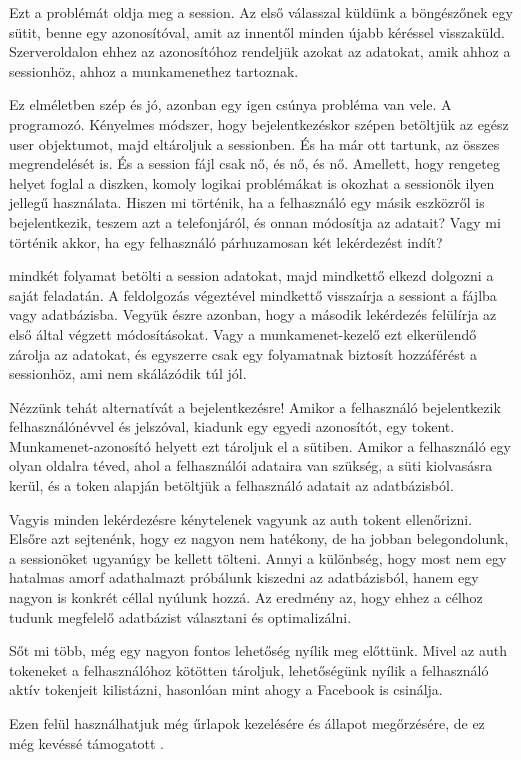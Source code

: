 Ezt a problémát oldja meg a session. Az első válasszal küldünk a böngészőnek egy sütit, benne egy azonosítóval, amit az innentől minden újabb kéréssel visszaküld. Szerveroldalon ehhez az azonosítóhoz rendeljük azokat az adatokat, amik ahhoz a sessionhöz, ahhoz a munkamenethez tartoznak.

Ez elméletben szép és jó, azonban egy igen csúnya probléma van vele. A programozó.
Kényelmes módszer, hogy bejelentkezéskor szépen betöltjük az egész user objektumot, majd eltároljuk a sessionben. És ha már ott tartunk, az összes megrendelését is. És a session fájl csak nő, és nő, és nő.
Amellett, hogy rengeteg helyet foglal a diszken, komoly logikai problémákat is okozhat a sessionök ilyen jellegű használata. Hiszen mi történik, ha a felhasználó egy másik eszközről is bejelentkezik, teszem azt a telefonjáról, és onnan módosítja az adatait? Vagy mi történik akkor, ha egy felhasználó párhuzamosan két lekérdezést indít?

mindkét folyamat betölti a session adatokat, majd mindkettő elkezd dolgozni a saját feladatán. A feldolgozás végeztével mindkettő visszaírja a sessiont a fájlba vagy adatbázisba. Vegyük észre azonban, hogy a második lekérdezés felülírja az első által végzett módosításokat. Vagy a munkamenet-kezelő ezt elkerülendő zárolja az adatokat, és egyszerre csak egy folyamatnak biztosít hozzáférést a sessionhöz, ami nem skálázódik túl jól.

Nézzünk tehát alternatívát a bejelentkezésre!
Amikor a felhasználó bejelentkezik felhasználónévvel és jelszóval, kiadunk egy egyedi azonosítót, egy tokent. Munkamenet-azonosító helyett ezt tároljuk el a sütiben. Amikor a felhasználó egy olyan oldalra téved, ahol a felhasználói adataira van szükség, a süti kiolvasásra kerül, és a token alapján betöltjük a felhasználó adatait az adatbázisból.

Vagyis minden lekérdezésre kénytelenek vagyunk az auth tokent ellenőrizni. Elsőre azt sejtenénk, hogy ez nagyon nem hatékony, de ha jobban belegondolunk, a sessionöket ugyanúgy be kellett tölteni. Annyi a különbség, hogy most nem egy hatalmas amorf adathalmazt próbálunk kiszedni az adatbázisból, hanem egy nagyon is konkrét céllal nyúlunk hozzá. Az eredmény az, hogy ehhez a célhoz tudunk megfelelő adatbázist választani és optimalizálni.

Sőt mi több, még egy nagyon fontos lehetőség nyílik meg előttünk. Mivel az auth tokeneket a felhasználóhoz kötötten tároljuk, lehetőségünk nyílik a felhasználó aktív tokenjeit kilistázni, hasonlóan mint ahogy a Facebook is csinálja.

Ezen felül használhatjuk még űrlapok kezelésére és állapot megőrzésére, de ez még kevéssé támogatott \cite{session}.

























